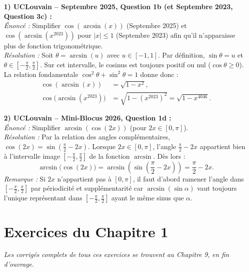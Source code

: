 \begin{exemple}
\textbf{1) UCLouvain -- Septembre 2025, Question 1b (et Septembre 2023, Question 3c) :}\\
\emph{Énoncé :} Simplifier $\cos(\arcsin(x))$ (Septembre 2025) et $\cos(\arcsin(x^{2023}))$ pour $|x| \le 1$ (Septembre 2023) afin qu'il n'apparaisse plus de fonction trigonométrique.\\
\emph{Résolution :} Soit $\theta = \arcsin(u)$ avec $u \in [-1, 1]$. Par définition, $\sin\theta = u$ et $\theta \in [-\frac{\pi}{2}, \frac{\pi}{2}]$. Sur cet intervalle, le cosinus est toujours positif ou nul ($\cos\theta \ge 0$). La relation fondamentale $\cos^2\theta + \sin^2\theta = 1$ donne donc :
\begin{align*}
    \cos(\arcsin(x)) &= \sqrt{1 - x^2}, \\
    \cos\bigl(\arcsin(x^{2023})\bigr) &= \sqrt{1 - (x^{2023})^2} = \sqrt{1 - x^{4046}}.
\end{align*}

\medskip
\textbf{2) UCLouvain -- Mini-Blocus 2026, Question 1d :}\\
\emph{Énoncé :} Simplifier $\arcsin(\cos(2x))$ (pour $2x \in [0, \pi]$).\\
\emph{Résolution :} Par la relation des angles complémentaires, $\cos(2x) = \sin\left(\frac{\pi}{2} - 2x\right)$. Lorsque $2x \in [0, \pi]$, l'angle $\frac{\pi}{2} - 2x$ appartient bien à l'intervalle image $\left[-\frac{\pi}{2}, \frac{\pi}{2}\right]$ de la fonction $\arcsin$. Dès lors :
\[
    \arcsin\bigl(\cos(2x)\bigr) = \arcsin\left(\sin\left(\frac{\pi}{2} - 2x\right)\right) = \frac{\pi}{2} - 2x.
\]
\emph{Remarque :} Si $2x$ n'appartient pas à $[0, \pi]$, il faut d'abord ramener l'angle dans $\left[-\frac{\pi}{2}, \frac{\pi}{2}\right]$ par périodicité et supplémentarité car $\arcsin(\sin\alpha)$ vaut toujours l'unique représentant dans $\left[-\frac{\pi}{2}, \frac{\pi}{2}\right]$ ayant le même sinus que $\alpha$.
\end{exemple}

\section{Exercices du Chapitre 1}

\emph{Les corrigés complets de tous ces exercices se trouvent au Chapitre 9, en fin d'ouvrage.}

